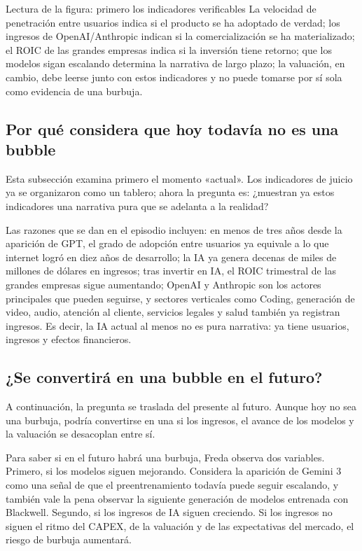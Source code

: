 \documentclass[a4paper]{article}
\begin{document}
\begin{knowledgebox}{Lectura de la figura: primero los indicadores verificables}
La velocidad de penetración entre usuarios indica si el producto se ha adoptado de verdad; los ingresos de OpenAI/Anthropic indican si la comercialización se ha materializado; el ROIC de las grandes empresas indica si la inversión tiene retorno; que los modelos sigan escalando determina la narrativa de largo plazo; la valuación, en cambio, debe leerse junto con estos indicadores y no puede tomarse por sí sola como evidencia de una burbuja.
\end{knowledgebox}

\subsection{Por qué considera que hoy todavía no es una bubble}

Esta subsección examina primero el momento «actual». Los indicadores de juicio ya se organizaron como un tablero; ahora la pregunta es: ¿muestran ya estos indicadores una narrativa pura que se adelanta a la realidad?

Las razones que se dan en el episodio incluyen: en menos de tres años desde la aparición de GPT, el grado de adopción entre usuarios ya equivale a lo que internet logró en diez años de desarrollo; la IA ya genera decenas de miles de millones de dólares en ingresos; tras invertir en IA, el ROIC trimestral de las grandes empresas sigue aumentando; OpenAI y Anthropic son los actores principales que pueden seguirse, y sectores verticales como Coding, generación de video, audio, atención al cliente, servicios legales y salud también ya registran ingresos. Es decir, la IA actual al menos no es pura narrativa: ya tiene usuarios, ingresos y efectos financieros.

\subsection{¿Se convertirá en una bubble en el futuro?}

A continuación, la pregunta se traslada del presente al futuro. Aunque hoy no sea una burbuja, podría convertirse en una si los ingresos, el avance de los modelos y la valuación se desacoplan entre sí.

Para saber si en el futuro habrá una burbuja, Freda observa dos variables. Primero, si los modelos siguen mejorando. Considera la aparición de Gemini 3 como una señal de que el preentrenamiento todavía puede seguir escalando, y también vale la pena observar la siguiente generación de modelos entrenada con Blackwell. Segundo, si los ingresos de IA siguen creciendo. Si los ingresos no siguen el ritmo del CAPEX, de la valuación y de las expectativas del mercado, el riesgo de burbuja aumentará.
\end{document}
